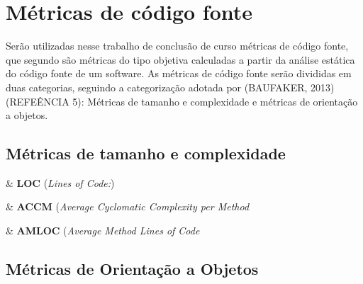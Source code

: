 
\section{Métricas de código fonte}

Serão utilizadas nesse trabalho de conclusão de curso métricas de código fonte, que segundo \cite{Meirelles2013} são métricas do tipo objetiva calculadas a partir da análise estática do código fonte de um software. As métricas de código fonte serão divididas em duas categorias, seguindo a categorização adotada por (BAUFAKER, 2013) (REFEÊNCIA 5): Métricas de tamanho e complexidade e métricas de orientação a objetos.

\subsection{Métricas de tamanho e complexidade}

\begin{easylist}[itemize]

	& \textbf{LOC} (\textit{Lines of Code:}) 
		
	& \textbf{ACCM} (\textit{Average Cyclomatic Complexity per Method}

	& \textbf{AMLOC} (\textit{Average Method Lines of Code}
	
\end{easylist}



\subsection{Métricas de Orientação a Objetos}



